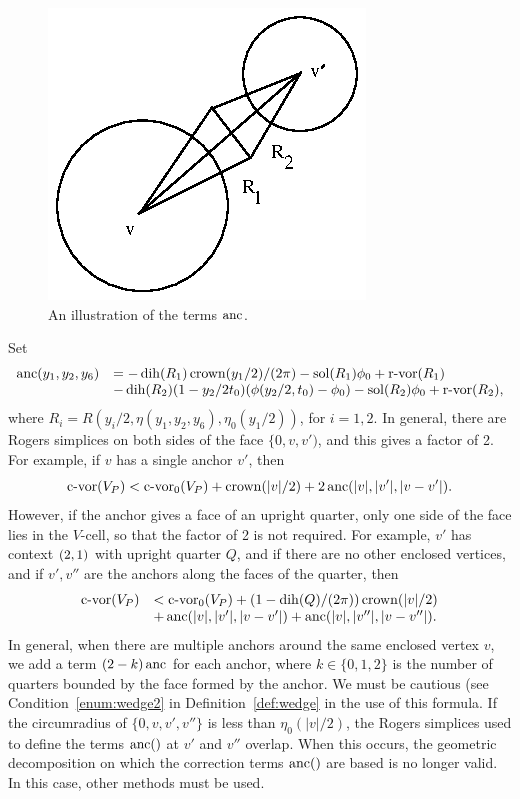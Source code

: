 \begin{figure}[htb]
  \centering
  \includegraphics{PS/diag44.ps}
  \caption{An illustration of the terms $\operatorname{anc}$.}
  \label{fig:anchor}
\end{figure}


Set
    \begin{equation}
    \begin{array}{lll}
    \operatorname{anc}(y_1,y_2,y_6) &= -\operatorname{dih}(R_1)\operatorname{crown}(y_1/2)/(2\pi)
        -\operatorname{sol}(R_1)\phi_0+{\operatorname{r-vor}}(R_1)\\
    &-\operatorname{dih}(R_2)(1-y_2/2t_0)(\phi(y_2/2,t_0)-\phi_0)
        -\operatorname{sol}(R_2)\phi_0 + {\operatorname{r-vor}}(R_2),
    \label{eqn:4.5}
    \end{array}
    \end{equation}
where $R_i=R(y_i/2,\eta(y_1,y_2,y_6),\eta_0(y_1/2))$, for $i=1,2$.
In general, there are Rogers simplices on both sides of the face
$\{0,v,v')$, and this gives a factor of 2. For example, if $v$ has
a single anchor $v'$, then
$${\operatorname{c-vor}}(V_P) < {\operatorname{c-vor}}_0(V_P) + \operatorname{crown}(|v|/2) + 2\operatorname{anc}(|v|,|v'|,|v-v'|).$$
However, if the anchor gives a face of an upright quarter, only
one side of the face lies in the $V$-cell,
 so that the factor of 2 is not required.
For example, $v'$ has context $\relax(2,1)$ with upright quarter $Q$,
and if there are no other enclosed vertices, and if $v',v''$ are
the anchors along the faces of the quarter,  then
    $$
    \begin{array}{lll}
    {\operatorname{c-vor}}(V_P)&< {\operatorname{c-vor}}_0(V_P) +(1-\operatorname{dih}(Q)/(2\pi))\operatorname{crown}(|v|/2)\\
    &+\operatorname{anc}(|v|,|v'|,|v-v'|)+\operatorname{anc}(|v|,|v''|,|v-v''|).
    \end{array}
    $$
In general, when there are multiple anchors around the same
enclosed vertex $v$, we add a term $(2-k)\operatorname{anc}$ for each anchor,
where $k\in\{0,1,2\}$ is the number of quarters bounded by the
face formed by the anchor. We must be cautious (see
Condition~\ref{enum:wedge2} in Definition~\ref{def:wedge} in the
use of this formula. If the circumradius of $\{0,v,v',v''\}$ is
less than $\eta_0(|v|/2)$, the Rogers simplices used to define the
terms $\operatorname{anc}()$ at $v'$ and $v''$ overlap. When this occurs, the
geometric decomposition on which the correction terms $\operatorname{anc}()$ are
based is no longer valid. In this case, other methods must be
used.

